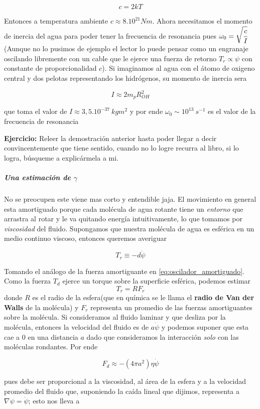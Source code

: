 \documentclass[a4paper,spanish]{article}
\numberwithin{equation}{section}
\begin{document}
\[c=2kT\]

Entonces a temperatura ambiente $c\approx 8.10^{21} N m$. Ahora necesitamos el momento de inercia del agua para poder tener la frecuencia de resonancia pues $\omega_0 = \sqrt{\cfrac{c}{I}}$ (Aunque no lo pusimos de ejemplo el lector lo puede pensar como un engranaje oscilando libremente con un cable que le ejerce una fuerza de retorno $T_r \propto \psi$ con constante de proporcionalidad $c$). Si imaginamos al agua con el \'atomo de oxigeno central y dos pelotas representando los hidr\'ogenos, su momento de inercia sera

\[I\approx 2m_p R_{OH} ^2\]

que toma el valor de $I \approx 3,5 . 10^{-37} \ kg m^2$ y por ende $\omega_0 \sim 10^{13} \ s^{-1}$ es el valor de la frecuencia de resonancia

\textbf{Ejercicio:} Releer la demostraci\'on anterior hasta poder llegar a decir convincentemente que tiene sentido, cuando no lo logre recurra al libro, si lo logra, b\'usqueme a explic\'armela a mi. 

\subparagraph*{Una estimaci\'on de $\gamma$}
No se preocupen este viene mas corto y entendible jaja. El movimiento en general esta amortiguado porque cada mol\'ecula de agua rotante tiene un \textit{entorno} que arrastra al rotar y le va quitando energ\'ia intuitivamente, lo que tomamos por \textit{viscosidad} del fluido. Supongamos que nuestra mol\'ecula de agua es esf\'erica en un medio continuo viscoso, entonces queremos averiguar

\begin{equation}
T_r \equiv -d\dot{\psi}
\end{equation}

Tomando el an\'alogo de la fuerza amortiguante en \ref{eq:oscilador_amortiguado}. Como la fuerza $T_d$ ejerce un torque sobre la superficie esf\'erica, podemos estimar \[T_r= R F_r\] donde $R$ es el radio de la esfera(que en qu\'imica se le llama el \textbf{radio de Van der Walls} de la mol\'ecula) y $F_r$ representa un promedio de las fuerzas amortiguantes sobre la mol\'ecula. Si consideramos al fluido laminar y que desliza por la mol\'ecula, entonces la velocidad del fluido es de $a\dot{\psi}$ y podemos suponer que esta cae a 0 en una distancia $a$ dado que consideramos la interacci\'on \textit{solo} con las mol\'eculas rondantes. Por ende

\[F_d \approx - \left(4\pi a^2\right)\eta\dot{\psi}\]

pues debe ser proporcional a la viscosidad, al \'area de la esfera y a la velocidad promedio del fluido que, suponiendo la ca\'ida lineal que dijimos, representa a $\nabla \psi = \dot{\psi}$; esto nos lleva a 
\end{document}
